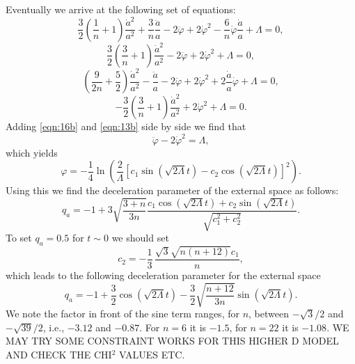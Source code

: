\documentclass[11pt,a4paper]{article}
\begin{document}
Eventually we arrive at the following set of equations:
\begin{equation}
\label{eqn:12b}
\frac{3}{2}\left(\frac{1}{n}+1\right)\frac{{\dot{a}}^2}{a^2}+\frac{3}{n}\frac{\ddot{a}}{a}-2\ddot{\varphi}+2{\dot{\varphi}}^2-\frac{6}{n}{\dot{\varphi}}\frac{\dot{a}}{a}+\Lambda=0,
\end{equation}
\begin{equation}
\label{eqn:13b}
\frac{3}{2}\left(\frac{3}{n}+1\right)\frac{{\dot{a}}^{2}}{a^2}-2{\ddot{\varphi}} +2{\dot{\varphi}}^{2}+\Lambda = 0,
\end{equation}
\begin{equation}
\label{eqn:14b}
\left(\frac{9}{2n}+\frac{5}{2}\right)\frac{\dot{a}^{2}}{a^2}-\frac{\ddot{a}}{a}-2{\ddot{\varphi}}+2{\dot{\varphi}}^{2}+2\frac{\dot{a}}{a}{\dot{\varphi}}+\Lambda=0,
\end{equation}
\begin{equation}
\label{eqn:16b}
-\frac{3}{2}\left(\frac{3}{n}+1\right)\frac{\dot{a}^{2}}{a^2}+2{\dot{\varphi}}^{2}+\Lambda = 0.
\end{equation}
Adding \eqref{eqn:16b} and \eqref{eqn:13b} side by side we find that
\begin{equation}
{\ddot{\varphi}}-2{\dot{\varphi}}^{2}=\Lambda,
\end{equation}
which yields
\begin{equation}
\varphi=-\frac{1}{4} \ln \left( \frac{2}{\Lambda} \left[c_1 \sin(\sqrt{2\Lambda}t) - c_2 \cos(\sqrt{2\Lambda}t)\right]^2 \right).
\end{equation}
Using this we find the deceleration parameter of the external space as follows:
\begin{equation}
q_a=-1+3\sqrt{\frac{3+n}{3n}}\frac{c_1 \cos(\sqrt{2\Lambda}t)+c_2 \sin(\sqrt{2\Lambda}t)}{\sqrt{c_1^2+c_2^2}}.
\end{equation}
To set $q_a=0.5$ for $t\sim0$ we should set
\begin{equation}
c_2=-\frac{1}{3}\,{\frac {\sqrt {3}\sqrt {n \left( n+12 \right) }{c_1}}{n}},
\end{equation}
which leads to the following deceleration parameter for the external space
\begin{equation}
q_a=-1+\frac{3}{2} \cos(\sqrt{2\Lambda}t)-\frac{3}{2} \sqrt{\frac{n+12}{3n}} \sin(\sqrt{2\Lambda}t).
\end{equation}
We note the factor in front of the sine term ranges, for $n$, between $-\sqrt{3}/2$ and $-\sqrt{39}/2$, i.e., $-3.12$ and $-0.87$. For $n=6$ it is $-1.5$, for $n=22$ it is $-1.08$. WE MAY TRY SOME CONSTRAINT WORKS FOR THIS HIGHER D MODEL AND CHECK THE CHI$^2$ VALUES ETC.
\end{document}
